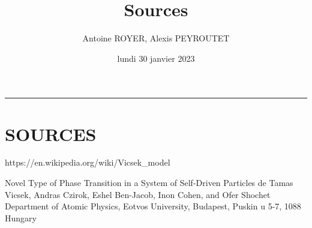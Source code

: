 \documentclass[french, a4paper, 12pt]{article}
\title{\sc Sources}
\author{ Antoine ROYER, Alexis PEYROUTET}
\date{lundi 30 janvier 2023}
\begin{document}
 \maketitle \vspace{3pt} \hrule \vspace{3pt}
\section*{SOURCES}

     https://en.wikipedia.org/wiki/Vicsek_model

     Novel Type of Phase Transition in a System of Self-Driven Particles de Tamas Vicsek, Andras Czirok, Eshel Ben-Jacob, Inon Cohen, and Ofer Shochet
     Department of Atomic Physics, Eotvos University, Budapest, Puskin u 5-7, 1088 Hungary
\end{document}
